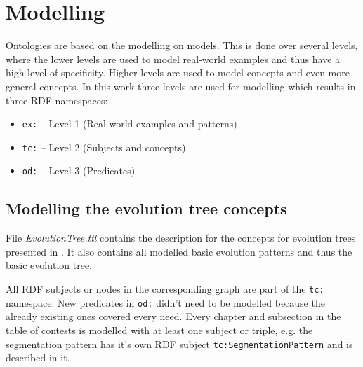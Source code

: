 \documentclass[11pt,a4paper]{article}
\begin{document}
\section{Modelling}

Ontologies are based on the modelling on models. This is done over several
levels, where the lower levels are used to model real-world examples and thus
have a high level of specificity. Higher levels are used to model concepts and
even more general concepts. In this work three levels are used for modelling
which results in three RDF namespaces: 

\begin{itemize}[noitemsep]
\item \texttt{ex:} -- Level 1 (Real world examples and patterns)
\item \texttt{tc:} -- Level 2 (Subjects and concepts)
\item \texttt{od:} -- Level 3 (Predicates) 
\end{itemize}

\subsection{Modelling the evolution tree concepts}

File \textit{EvolutionTree.ttl} contains the description for the concepts for
evolution trees presented in \cite{Shpakovsky2016}. It also contains all
modelled basic evolution patterns and thus the basic evolution tree.

All RDF subjects or nodes in the corresponding graph are part of the
\texttt{tc:} namespace. New predicates in \texttt{od:} didn't need to be
modelled because the already existing ones covered every need. Every chapter
and subsection in the table of contests is modelled with at least one subject
or triple, e.g. the segmentation pattern has it's own RDF subject
\texttt{tc:SegmentationPattern} and is described in it.
\end{document}
